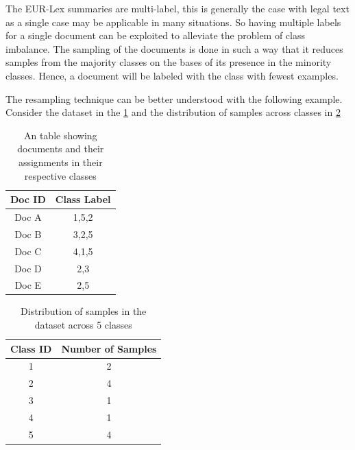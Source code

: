 The EUR-Lex summaries are multi-label, this is generally the case with legal text as a single case may be applicable in many situations. So having multiple labels for a single document can be exploited to alleviate the problem of class imbalance. The sampling of the documents is done in such a way that it reduces samples from the majority classes on the bases of its presence in the minority classes. Hence, a document will be labeled with the class with fewest examples. 

The resampling technique can be better understood with the following example. Consider the dataset in the \ref{table:exampleDataResampling} and the distribution of samples across classes in \ref{table:SamplesDistributionDataResamplingExample}

\begin{table}[!ht]
\centering
\begin{tabular}{cc}

\hline
\textbf{Doc ID} & \textbf{Class Label} \\ \hline
Doc A           & 1,5,2                \\ 
Doc B           & 3,2,5                    \\ 
Doc C           & 4,1,5                  \\ 
Doc D           & 2,3                    \\ 
Doc E           & 2,5                  \\ \hline
\end{tabular}
\captionsetup{justification=centering,margin=2cm}
\caption{An table showing documents and their assignments in their respective classes}
\label{table:exampleDataResampling}
\end{table}

\begin{table}[!ht]
\centering
\begin{tabular}{cc}
\hline
\textbf{Class ID} & \textbf{Number of Samples} \\ \hline
1                 & 2                         \\ 
2                 & 4                          \\ 
3                 & 1                          \\ 
4                 & 1                          \\ 
5                 & 4                         \\ \hline
\end{tabular}
\captionsetup{justification=centering,margin=2cm}
\caption{Distribution of samples in the dataset across 5 classes}
\label{table:SamplesDistributionDataResamplingExample}
\end{table}

